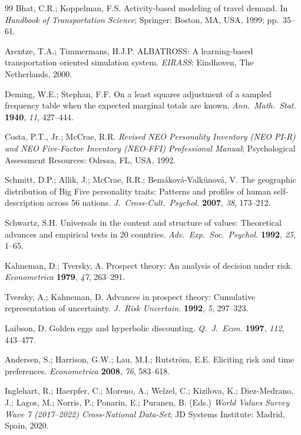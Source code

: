 \documentclass[a4paper,12pt]{article}
\begin{document}
\begin{thebibliography}{99}
Bhat, C.R.; Koppelman, F.S. Activity-based modeling of travel demand.
In \textit{Handbook of Transportation Science}; Springer: Boston, MA, USA,
1999; pp.~35--61.

Arentze, T.A.; Timmermans, H.J.P. ALBATROSS: A learning-based transportation
oriented simulation system. \textit{EIRASS}: Eindhoven, The Netherlands, 2000.

Deming, W.E.; Stephan, F.F. On a least squares adjustment of a sampled
frequency table when the expected marginal totals are known.
\textit{Ann.\ Math.\ Stat.} \textbf{1940}, \textit{11}, 427--444.

Costa, P.T., Jr.; McCrae, R.R.
\textit{Revised NEO Personality Inventory (NEO PI-R) and NEO Five-Factor
Inventory (NEO-FFI) Professional Manual}; Psychological Assessment Resources:
Odessa, FL, USA, 1992.

Schmitt, D.P.; Allik, J.; McCrae, R.R.; Bem{\'a}kov{\'a}-Valk{\"u}nov{\'a}, V.
The geographic distribution of Big Five personality traits: Patterns and
profiles of human self-description across 56 nations.
\textit{J.\ Cross-Cult.\ Psychol.} \textbf{2007}, \textit{38}, 173--212.

Schwartz, S.H. Universals in the content and structure of values:
Theoretical advances and empirical tests in 20 countries.
\textit{Adv.\ Exp.\ Soc.\ Psychol.} \textbf{1992}, \textit{25}, 1--65.

Kahneman, D.; Tversky, A. Prospect theory: An analysis of decision under risk.
\textit{Econometrica} \textbf{1979}, \textit{47}, 263--291.

Tversky, A.; Kahneman, D. Advances in prospect theory: Cumulative
representation of uncertainty.
\textit{J.\ Risk Uncertain.} \textbf{1992}, \textit{5}, 297--323.

Laibson, D. Golden eggs and hyperbolic discounting.
\textit{Q.\ J.\ Econ.} \textbf{1997}, \textit{112}, 443--477.

Andersen, S.; Harrison, G.W.; Lau, M.I.; Rutstr{\"o}m, E.E. Eliciting risk
and time preferences.
\textit{Econometrica} \textbf{2008}, \textit{76}, 583--618.

Inglehart, R.; Haerpfer, C.; Moreno, A.; Welzel, C.; Kizilova, K.;
Diez-Medrano, J.; Lagos, M.; Norris, P.; Ponarin, E.; Puranen, B. (Eds.)
\textit{World Values Survey Wave 7 (2017--2022) Cross-National Data-Set};
JD Systems Institute: Madrid, Spain, 2020.


\end{thebibliography}
\end{document}
